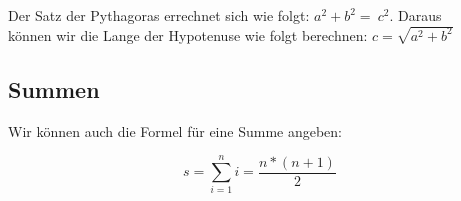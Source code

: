 \documentclass[11pt]{article}
\begin{document}
Der Satz der Pythagoras errechnet sich wie folgt: $a^{2} + b^{2} =\ c^{2}$. Daraus\\ 
k\"onnen wir die Lange der Hypotenuse wie folgt berechnen: $c =\sqrt{a^{2} + b^{2}}$ 

\subsection{Summen}

Wir k\"onnen auch die Formel f\"ur eine Summe angeben:

\begin{equation}
s = \sum_{i=1}^n i = \frac{n*(n+1)}{2}
\end{equation}
\end{document}
